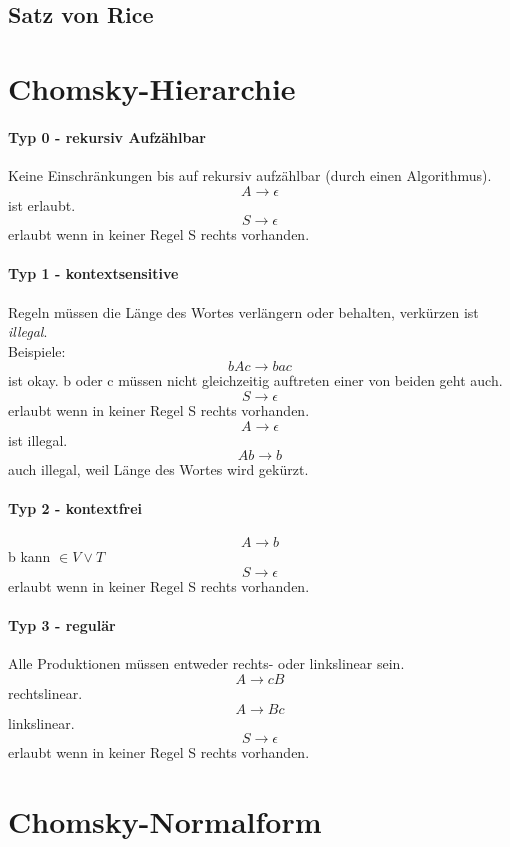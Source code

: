 \documentclass[a4paper]{scrartcl}
\begin{document}
		\subsection{Satz von Rice}
		
	\section{Chomsky-Hierarchie}
		\paragraph{Typ 0 - rekursiv Aufzählbar}
		Keine Einschränkungen bis auf rekursiv aufzählbar (durch einen Algorithmus).
		\[ A \to \epsilon \] ist erlaubt.
		\[ S \to \epsilon \] erlaubt wenn in keiner Regel S rechts vorhanden.
		
		\paragraph{Typ 1 - kontextsensitive}
		Regeln müssen die Länge des Wortes verlängern oder behalten, verkürzen ist \emph{illegal}.\\
	
		Beispiele:
		\[ bAc \to bac \] ist okay. b oder c müssen nicht gleichzeitig auftreten einer von beiden geht auch.
		\[ S \to \epsilon \] erlaubt wenn in keiner Regel S rechts vorhanden.
		\[ A \to \epsilon \] ist illegal.
		\[ Ab \to b \] auch illegal, weil Länge des Wortes wird gekürzt.
		
		\paragraph{Typ 2 - kontextfrei}
		\[ A \to b \] b kann \( \in V \lor T \)
		\[ S \to \epsilon \] erlaubt wenn in keiner Regel S rechts vorhanden.
		
		\paragraph{Typ 3 - regulär}
		Alle Produktionen müssen entweder rechts- oder linkslinear sein.
		\[ A \to cB \] rechtslinear.
		\[ A \to Bc \]  linkslinear.
		\[ S \to \epsilon \] erlaubt wenn in keiner Regel S rechts vorhanden.
	
	\section{Chomsky-Normalform}
\end{document}
